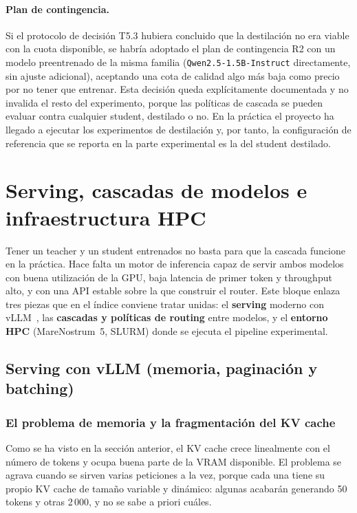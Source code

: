 \documentclass[11pt,a4paper]{article}
\begin{document}
\paragraph{Plan de contingencia.} Si el protocolo de decisión T5.3 hubiera concluido que la destilación no era viable con la cuota disponible, se habría adoptado el plan de contingencia R2 con un modelo preentrenado de la misma familia (\texttt{Qwen2.5-1.5B-Instruct} directamente, sin ajuste adicional), aceptando una cota de calidad algo más baja como precio por no tener que entrenar. Esta decisión queda explícitamente documentada y no invalida el resto del experimento, porque las políticas de cascada se pueden evaluar contra cualquier student, destilado o no. En la práctica el proyecto ha llegado a ejecutar los experimentos de destilación y, por tanto, la configuración de referencia que se reporta en la parte experimental es la del student destilado.

\section{Serving, cascadas de modelos e infraestructura HPC}
\label{sec:serving-teorico}

Tener un teacher y un student entrenados no basta para que la cascada funcione en la práctica. Hace falta un motor de inferencia capaz de servir ambos modelos con buena utilización de la GPU, baja latencia de primer token y throughput alto, y con una API estable sobre la que construir el router. Este bloque enlaza tres piezas que en el índice conviene tratar unidas: el \textbf{serving} moderno con vLLM~\cite{vllm2023, vllm-docs}, las \textbf{cascadas y políticas de routing} entre modelos, y el \textbf{entorno HPC} (MareNostrum~5, SLURM) donde se ejecuta el pipeline experimental.

\subsection{Serving con vLLM (memoria, paginación y batching)}

\subsubsection{El problema de memoria y la fragmentación del KV cache}

Como se ha visto en la sección anterior, el KV cache crece linealmente con el número de tokens y ocupa buena parte de la VRAM disponible. El problema se agrava cuando se sirven varias peticiones a la vez, porque cada una tiene su propio KV cache de tamaño variable y dinámico: algunas acabarán generando 50 tokens y otras 2\,000, y no se sabe a priori cuáles.
\end{document}
